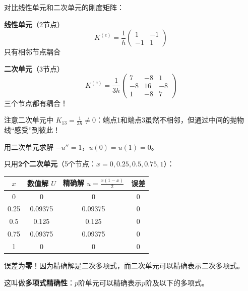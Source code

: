 \begin{physicalmeaning}
对比线性单元和二次单元的刚度矩阵：

\vspace{0.3cm}
\begin{minipage}[t]{0.45\textwidth}
\centering
\textbf{线性单元}（2节点）
\[
K^{(e)} = \frac{1}{h} \begin{pmatrix}
1 & -1 \\
-1 & 1
\end{pmatrix}
\]
只有相邻节点耦合
\end{minipage}
\hfill
\begin{minipage}[t]{0.45\textwidth}
\centering
\textbf{二次单元}（3节点）
\[
K^{(e)} = \frac{1}{3h} \begin{pmatrix}
7 & -8 & 1 \\
-8 & 16 & -8 \\
1 & -8 & 7
\end{pmatrix}
\]
三个节点都有耦合！
\end{minipage}

\vspace{0.3cm}
注意二次单元中 $K_{13} = \frac{1}{3h} \neq 0$：端点1和端点3虽然不相邻，但通过中间的抛物线“感受”到彼此！
\end{physicalmeaning}

\begin{example}[精度提升的威力]
用二次单元求解 $-u'' = 1$，$u(0) = u(1) = 0$。

只用\textbf{2个二次单元}（5个节点：$x = 0, 0.25, 0.5, 0.75, 1$）：

\begin{center}
\begin{tabular}{c|c|c|c}
\toprule
$x$ & 数值解 $U$ & 精确解 $u = \frac{x(1-x)}{2}$ & 误差 \\
\midrule
0 & 0 & 0 & 0 \\
0.25 & 0.09375 & 0.09375 & 0 \\
0.5 & 0.125 & 0.125 & 0 \\
0.75 & 0.09375 & 0.09375 & 0 \\
1 & 0 & 0 & 0 \\
\bottomrule
\end{tabular}
\end{center}

误差为\textbf{零}！因为精确解是二次多项式，而二次单元可以精确表示二次多项式。

这叫做\textbf{多项式精确性}：$p$阶单元可以精确表示$p$阶及以下的多项式。
\end{example}

